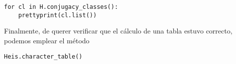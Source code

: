 \documentclass[11pt, reqno]{amsart}
\begin{document}
\begin{additional}
\begin{verbatim}
for cl in H.conjugacy_classes():
    prettyprint(cl.list())
\end{verbatim}
Finalmente, de querer verificar que el cálculo de una tabla estuvo correcto, podemos emplear el método
\begin{verbatim}
Heis.character_table()
\end{verbatim}

\printbibliography
\end{additional}
\end{document}
